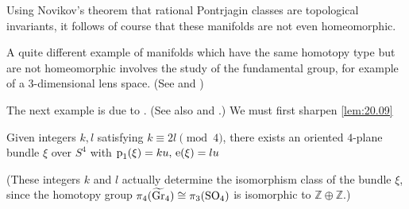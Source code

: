 \documentclass[../main]{subfiles}
\begin{document}
Using Novikov's theorem that rational Pontrjagin classes are topological invariants, it follows of course that these manifolds are not even homeomorphic.

A quite different example of manifolds which have the same homotopy type but are not homeomorphic involves the study of the fundamental group, for example of a 3-dimensional lens space. (See \cite{brody} and \cite{chapman})

The next example is due to \cite{thom1968}. (See also \cite{milnor1956} and \cite{shimada}.) We must first sharpen \ref{lem:20.09}

\begin{lemma}\label{lem:20.10} Given integers $k, l$ satisfying $k \equiv 2 l\pmod 4$, there exists an oriented $4$-plane bundle $\xi$ over $S^{4}$ with $\operatorname{p}_{1}(\xi)=ku,\, \operatorname{e}(\xi)=l u$

\end{lemma}

(These integers $k$ and $l$ actually determine the isomorphism class of the bundle $\xi$, since the homotopy group $\pi_{4}(\xtilde{\grassmannian}_{4}) \cong \pi_{3}(\SO_{4})$ is isomorphic to $\mathbb{Z} \oplus \mathbb{Z}$.)
\end{document}
